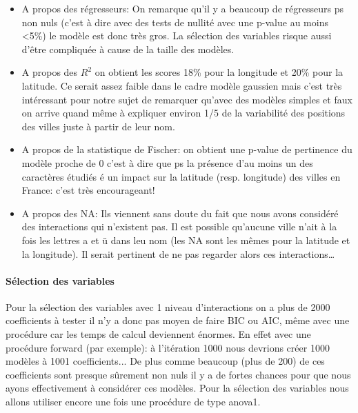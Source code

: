 \documentclass[french]{article}%
\begin{document}
			\begin{itemize}
				
				\item A propos des régresseurs: On remarque qu’il y a beaucoup de régresseurs ps non nuls (c’est à dire avec des tests de nullité avec une p-value au moins <5\%) le modèle est donc très gros. La sélection des variables risque aussi d’être compliquée à cause de la taille des modèles.
				
				\item A propos des $R^{2}$ on obtient les scores 18\% pour la longitude et 20\% pour la latitude. Ce serait assez faible dans le cadre modèle gaussien mais c’est très intéressant pour notre sujet de remarquer qu’avec des modèles simples et faux on arrive quand même à expliquer environ 1/5 de la variabilité des positions des villes juste à partir de leur nom.
				
				\item A propos de la statistique de Fischer: on obtient une p-value de pertinence du modèle proche de 0 c’est à dire que ps la présence d’au moins un des caractères étudiés é un impact sur la latitude (resp. longitude) des villes en France: c’est très encourageant!
				
				\item A propos des NA: Ils viennent sans doute du fait que nous avons considéré des interactions qui n’existent pas. Il est possible qu’aucune ville n’ait à la fois les lettres a et ü dans leu nom (les NA sont les mêmes pour la latitude et la longitude). Il serait pertinent de ne pas regarder alors ces interactions…
				
			\end{itemize}	
			
		\paragraph*{Sélection des variables}
		
			Pour la sélection des variables avec 1 niveau d'interactions on a plus de 2000 coefficients à tester il n'y a donc pas moyen de faire BIC ou AIC, même avec une procédure car les temps de calcul deviennent énormes. En effet avec une procédure forward (par exemple): à l'itération 1000 nous devrions créer 1000 modèles à 1001 coefficients... De plus comme beaucoup (plus de 200) de ces coefficients sont presque sûrement non nuls il y a de fortes chances pour que nous ayons effectivement à considérer ces modèles. Pour la sélection des variables nous allons utiliser encore une fois une procédure de type anova1.
		
\end{document}
